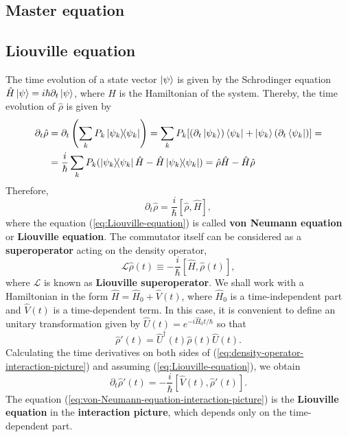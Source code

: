 \subsection{Master equation}
\label{sec:master-equation}

%
\subsection{Liouville equation}
\label{sec:Liouville-equations}
%

The time evolution of a state vector $ \ket{\psi} $ is given by the Schrodinger equation $ \hat{H} \ket{\psi} = i \hbar \partial_t \ket{\psi} $, where $ \hat{H} $ is the Hamiltonian of the system. Thereby, the time evolution of $ \hat{\rho} $ is given by
\begin{align}
	\partial_t \hat{\rho} &= \partial_t \left( \sum_{k} P_k \ketbra{\psi_k}{\psi_k} \right) = \sum_{k} P_k [(\partial_t \ket{\psi_k})\bra{\psi_k} + \ket{\psi_k}(\partial_t \bra{\psi_k})] = \\
	&= \frac{i}{\hbar} \sum_{k} P_k (\ketbra{\psi_k}{\psi_k} \hat{H} - \hat{H}\ketbra{\psi_k}{\psi_k}) = \hat{\rho}\hat{H} - \hat{H}\hat{\rho}
\end{align}
Therefore,
\begin{equation}
	\partial_t \hat{\rho} = \frac{i}{\hbar} [\hat{\rho}, \hat{H}],
	\label{eq:Liouville-equation}
\end{equation}
where the equation (\ref{eq:Liouville-equation}) is called \textbf{von Neumann equation} or \textbf{Liouville equation}. The commutator itself can be considered as a \textbf{superoperator} acting on the density operator,
\begin{equation}
	\mathcal{L}\hat{\rho}(t) \equiv - \frac{i}{\hbar} [\hat{H}, \hat{\rho}(t)],
	\label{eq:Liouville-superoperator}
\end{equation}
where $ \mathcal{L} $ is known as \textbf{Liouville superoperator}. We shall work with a Hamiltonian in the form $ \hat{H} = \hat{H}_0 + \hat{V}(t) $, where $ \hat{H}_0 $ is a time-independent part and $ \hat{V}(t) $ is a time-dependent term. In this case, it is convenient to define an unitary transformation given by $ \hat{U}(t) = e^{- i \hat{H}_0 t / \hbar} $ so that
\begin{equation}
	\hat{\rho}'(t) = \hat{U}^{\dagger}(t)\hat{\rho}(t)\hat{U}(t).
	\label{eq:density-operator-interaction-picture}
\end{equation}
Calculating the time derivatives on both sides of (\ref{eq:density-operator-interaction-picture}) and assuming (\ref{eq:Liouville-equation}), we obtain
\begin{equation}
	\partial_t \hat{\rho}'(t) = - \frac{i}{\hbar} [\hat{V}(t), \hat{\rho}'(t)].
	\label{eq:von-Neumann-equation-interaction-picture}
\end{equation}
The equation (\ref{eq:von-Neumann-equation-interaction-picture}) is the \textbf{Liouville equation} in the \textbf{interaction picture}, which depends only on the time-dependent part.

